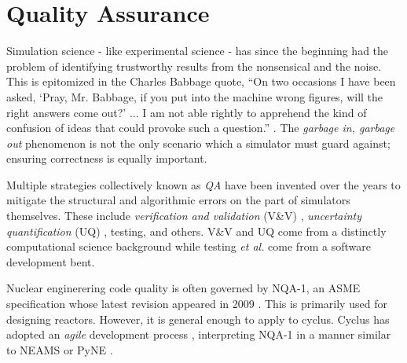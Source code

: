 \section{Quality Assurance}
%

%


Simulation science - like experimental science - has since the beginning had the 
problem of identifying trustworthy results from the nonsensical and the noise.
This is epitomized in the Charles Babbage quote, ``On two occasions I have been asked, 
`Pray, Mr. Babbage, if you put into the machine wrong figures, will the right 
answers come out?' ... I am not able rightly to apprehend the kind of confusion 
of ideas that could provoke such a question.'' \cite{babbage_passages_2011}. 
The \emph{garbage in, garbage out} phenomenon is not the only scenario which a
simulator must guard against; ensuring correctness is equally important.

Multiple strategies collectively known as \emph{\gls{QA}} have 
been invented over the years to mitigate the structural and algorithmic errors
on the part of simulators themselves. These include \emph{verification and validation}
(V\&V) \cite{boehm_software_1989}, \emph{uncertainty quantification} (UQ) 
\cite{sacks_design_1989}, testing, and others. V\&V and UQ come from 
a distinctly computational science background while testing \emph{et al.} come from 
a software development bent. 

Nuclear enginerering code quality is often governed by NQA-1, an ASME specification 
whose latest revision appeared in 2009 \cite{asme_nqa-1a-2009_2009}. This is primarily 
used for designing reactors. However, it is general enough to apply to 
cyclus. Cyclus has adopted an \emph{agile} development process 
\cite{larman_agile_2004}, 
interpreting NQA-1 in a manner similar to NEAMS \cite{neams_nuclear_2013} or 
PyNE \cite{biondo_quality_2014}. 

